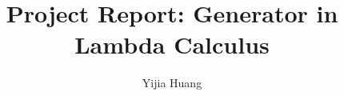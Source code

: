 \documentclass{llncs}
\begin{document}
\title{Project Report: Generator in Lambda Calculus}
\author{Yijia Huang }
\maketitle

\begin{abstract}

\end{abstract}


%

 
 

%
%



  
\end{document}
